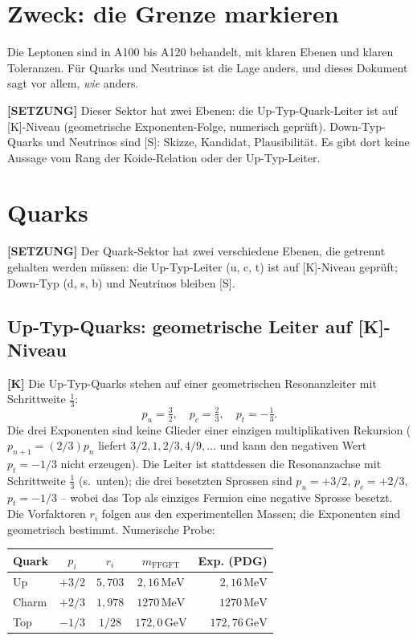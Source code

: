 \section{Zweck: die Grenze markieren}

Die Leptonen sind in A100 bis A120 behandelt, mit klaren Ebenen und klaren
Toleranzen. Für Quarks und Neutrinos ist die Lage anders, und dieses Dokument
sagt vor allem, \emph{wie} anders.

\textbf{[SETZUNG]} Dieser Sektor hat zwei Ebenen: die Up-Typ-Quark-Leiter
ist auf [K]-Niveau (geometrische Exponenten-Folge, numerisch geprüft). Down-Typ-Quarks
und Neutrinos sind [S]: Skizze, Kandidat, Plausibilität. Es gibt dort keine
Aussage vom Rang der Koide-Relation oder der Up-Typ-Leiter.

\section{Quarks}

\textbf{[SETZUNG]} Der Quark-Sektor hat zwei verschiedene Ebenen, die getrennt
gehalten werden müssen: die Up-Typ-Leiter (u, c, t) ist auf [K]-Niveau geprüft;
Down-Typ (d, s, b) und Neutrinos bleiben [S].

\subsection{Up-Typ-Quarks: geometrische Leiter auf [K]-Niveau}

\textbf{[K]} Die Up-Typ-Quarks stehen auf einer geometrischen Resonanzleiter
mit Schrittweite $\tfrac13$:
\[
  p_u = \tfrac32,\quad p_c = \tfrac23,\quad p_t = -\tfrac13.
\]
Die drei Exponenten sind keine Glieder einer einzigen multiplikativen Rekursion
($p_{n+1}=(2/3)p_n$ liefert $3/2,1,2/3,4/9,\ldots$ und kann den negativen Wert
$p_t=-1/3$ nicht erzeugen). Die Leiter ist stattdessen die Resonanzachse mit
Schrittweite $\tfrac13$ (s.\ unten); die drei besetzten Sprossen sind
$p_u=+3/2$, $p_c=+2/3$, $p_t=-1/3$ -- wobei das Top als einziges Fermion
eine negative Sprosse besetzt. Die Vorfaktoren $r_i$ folgen aus den
experimentellen Massen; die Exponenten sind geometrisch bestimmt. Numerische Probe:

\begin{center}
\renewcommand{\arraystretch}{1.3}
{\small\begin{tabular}{lcccr}
\toprule
Quark & $p_i$ & $r_i$ & $m_\text{FFGFT}$ & Exp. (PDG) \\
\midrule
Up    & $+3/2$ & $5{,}703$ & $2{,}16\,\text{MeV}$    & $2{,}16\,\text{MeV}$ \\
Charm & $+2/3$ & $1{,}978$ & $1270\,\text{MeV}$      & $1270\,\text{MeV}$ \\
Top   & $-1/3$ & $1/28$    & $172{,}0\,\text{GeV}$   & $172{,}76\,\text{GeV}$ \\
\bottomrule
\end{tabular}}
\renewcommand{\arraystretch}{1.0}
\end{center}

